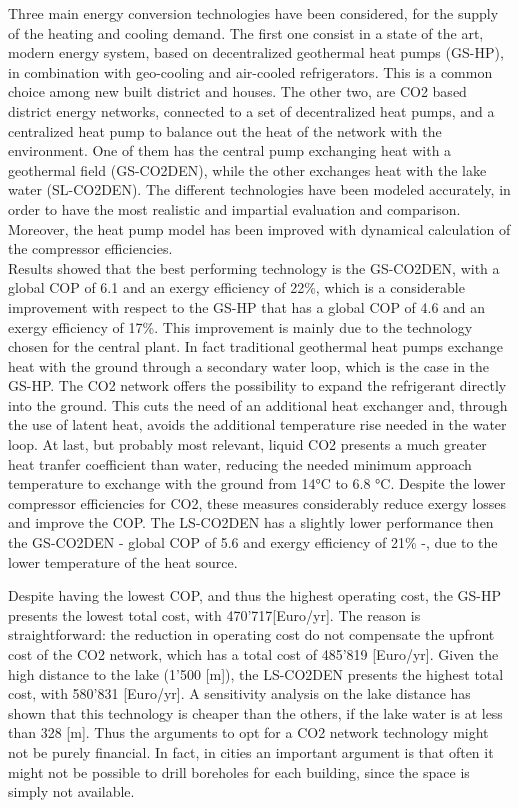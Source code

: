 \documentclass{article}
\begin{document}
Three main energy conversion technologies have been considered, for the supply of the heating and cooling demand. The first one consist in a state of the art, modern energy system, based on decentralized geothermal heat pumps (GS-HP), in combination with geo-cooling and air-cooled refrigerators. This is a common choice among new built district and houses. The other two, are CO2 based district energy networks, connected to a set of decentralized heat pumps, and a centralized heat pump to balance out the heat of the network with the environment. One of them has the central pump exchanging heat with a geothermal field (GS-CO2DEN), while the other exchanges heat with the lake water (SL-CO2DEN). The different technologies have been modeled accurately, in order to have the most realistic and impartial evaluation and comparison. Moreover, the heat pump model has been improved with dynamical calculation of the compressor efficiencies.\\

Results showed that the best performing technology is the GS-CO2DEN, with a global COP of 6.1 and an exergy efficiency of 22\%, which is a considerable improvement with respect to the GS-HP that has a global COP of 4.6 and an exergy efficiency of 17\%. This improvement is mainly due to the technology chosen for the central plant. In fact traditional geothermal heat pumps exchange heat with the ground through a secondary water loop, which is the case in the GS-HP. The CO2 network offers the possibility to expand the refrigerant directly into the ground. This cuts the need of an additional heat exchanger and, through the use of latent heat, avoids the additional temperature rise needed in the water loop. At last, but probably most relevant, liquid CO2 presents a much greater heat tranfer coefficient than water, reducing the needed minimum approach temperature to exchange with the ground from 14\si{\celsius} to 6.8 \si{\celsius}. Despite the lower compressor efficiencies for CO2, these measures considerably reduce exergy losses and improve the COP. The LS-CO2DEN has a slightly lower performance then the GS-CO2DEN - global COP of 5.6 and exergy efficiency of 21\% -, due to the lower temperature of the heat source.

Despite having the lowest COP, and thus the highest operating cost, the GS-HP presents the lowest total cost, with 470'717[Euro/yr]. The reason is straightforward: the reduction in operating cost do not compensate the upfront cost of the CO2 network, which has a total cost of 485'819 [Euro/yr]. Given the high distance to the lake (1'500 [m]), the LS-CO2DEN presents the highest total cost, with 580'831 [Euro/yr]. A sensitivity analysis on the lake distance has shown that this technology is cheaper than the others, if the lake water is at less than 328 [m]. Thus the arguments to opt for a CO2 network technology might not be purely financial. In fact, in cities an important argument is that often it might not be possible to drill boreholes for each building, since the space is simply not available.
\end{document}
